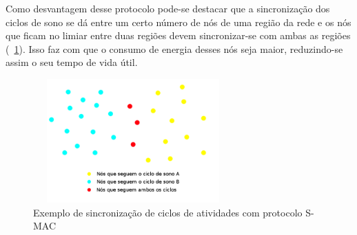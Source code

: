  Como desvantagem desse protocolo pode-se destacar que a sincronização dos ciclos de sono se dá entre um certo número de nós de uma região da rede e os nós que ficam no limiar entre duas regiões devem sincronizar-se com ambas as regiões (~\ref{fig:SmacSynch}). Isso faz com que o consumo de energia desses nós seja maior, reduzindo-se assim o seu tempo de vida útil.

\begin{figure}[!htb]
\centering
\includegraphics[width=290px,height=180px]{./Pictures/S-MACSynchronization.png}
\caption{Exemplo de sincronização de ciclos de atividades com protocolo S-MAC} %
\label{fig:SmacSynch} %
\end{figure}
 
 



% 

